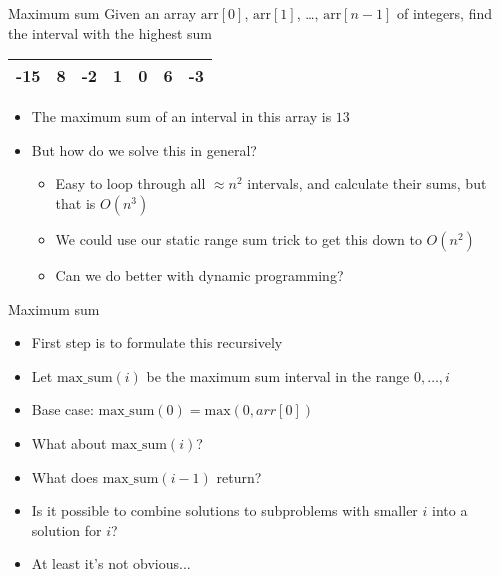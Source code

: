    \begin{frame}[fragile]{Maximum sum}
Given an array $\mathrm{arr}[0]$, $\mathrm{arr}[1]$, \ldots, $\mathrm{arr}[n-1]$ of integers, find the interval with the highest sum


    \begin{center}
        \begin{tabular}{|c|c|c|c|c|c|c|}
            \hline
            -15 & {8} & {-2} & {1} & {0} & {6} & -3 \\
            \hline
        \end{tabular}
    \end{center}

    \begin{itemize}
        \item The maximum sum of an interval in this array is $13$

        \item But how do we solve this in general?
            \begin{itemize}
        \item Easy to loop through all $\approx n^2$ intervals, and calculate their sums, but that is $O(n^3)$
        \item We could use our static range sum trick to get this down to $O(n^2)$
        \item Can we do better with dynamic programming?
            \end{itemize}
    \end{itemize}

\end{frame}

   \begin{frame}[fragile]{Maximum sum}

    \begin{itemize}
        \item First step is to formulate this recursively
        \item Let $\mathrm{max\_{}sum}(i)$ be the maximum sum interval in the range $0,\ldots,i$
        \item Base case: $\mathrm{max\_{}sum}(0) = \mathrm{max}(0, arr[0])$
        \item What about $\mathrm{max\_{}sum}(i)$?
        \item What does $\mathrm{max\_{}sum}(i-1)$ return?
        \item Is it possible to combine solutions to subproblems with smaller $i$ into a solution for $i$?
        \item At least it's not obvious...
    \end{itemize}

\end{frame}

